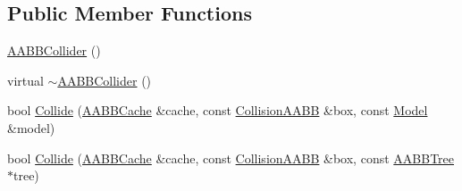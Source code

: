 \subsection*{Public Member Functions}
\begin{DoxyCompactItemize}
\item 
\hyperlink{classOpcode_1_1AABBCollider_a6a679c11c6a716b1f7a387aa5fa1884a}{A\+A\+B\+B\+Collider} ()
\item 
virtual \hyperlink{classOpcode_1_1AABBCollider_a21f405d3f68a7196286ba9933e34674e}{$\sim$\+A\+A\+B\+B\+Collider} ()
\item 
bool \hyperlink{classOpcode_1_1AABBCollider_a6c5443558bd612a744bbfc74ff2b7368}{Collide} (\hyperlink{structOpcode_1_1AABBCache}{A\+A\+B\+B\+Cache} \&cache, const \hyperlink{classOpcode_1_1CollisionAABB}{Collision\+A\+A\+BB} \&box, const \hyperlink{classOpcode_1_1Model}{Model} \&model)
\item 
bool \hyperlink{classOpcode_1_1AABBCollider_ad26d4fe09769619954dad20961c56f78}{Collide} (\hyperlink{structOpcode_1_1AABBCache}{A\+A\+B\+B\+Cache} \&cache, const \hyperlink{classOpcode_1_1CollisionAABB}{Collision\+A\+A\+BB} \&box, const \hyperlink{classOpcode_1_1AABBTree}{A\+A\+B\+B\+Tree} $\ast$tree)
\end{DoxyCompactItemize}
